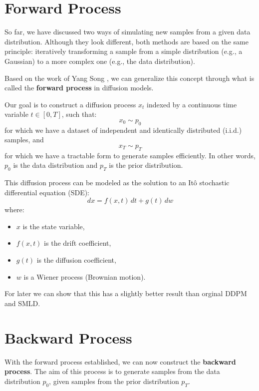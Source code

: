 \section{Forward Process}
So far, we have discussed two ways of simulating new samples from a given data distribution. Although they look different, both methods are based on the same principle: iteratively transforming a sample from a simple distribution (e.g., a Gaussian) to a more complex one (e.g., the data distribution). 

Based on the work of Yang Song \cite{song_generative_2020}, we can generalize this concept through what is called the \textbf{forward process} in diffusion models.

Our goal is to construct a diffusion process \( x_{t} \) indexed by a continuous time variable \( t \in [0, T] \), such that:
\begin{equation}
    x_{0} \sim p_{0}
\end{equation}
for which we have a dataset of independent and identically distributed (i.i.d.) samples, and
\begin{equation}
    x_{T} \sim p_{T}
\end{equation}
for which we have a tractable form to generate samples efficiently. In other words, \( p_{0} \) is the data distribution and \( p_{T} \) is the prior distribution.

This diffusion process can be modeled as the solution to an Itô stochastic differential equation (SDE):
\begin{equation}
    dx = f(x, t) \, dt + g(t) \, dw
\end{equation}
where:
\begin{itemize}
    \item \( x \) is the state variable,
    \item \( f(x, t) \) is the drift coefficient,
    \item \( g(t) \) is the diffusion coefficient,
    \item \( w \) is a Wiener process (Brownian motion).
\end{itemize}

For later we can show that this has a slightly better result than orginal DDPM and SMLD.



\section{Backward Process}

With the forward process established, we can now construct the \textbf{backward process}. The aim of this process is to generate samples from the data distribution \( p_{0} \), given samples from the prior distribution \( p_{T} \).

